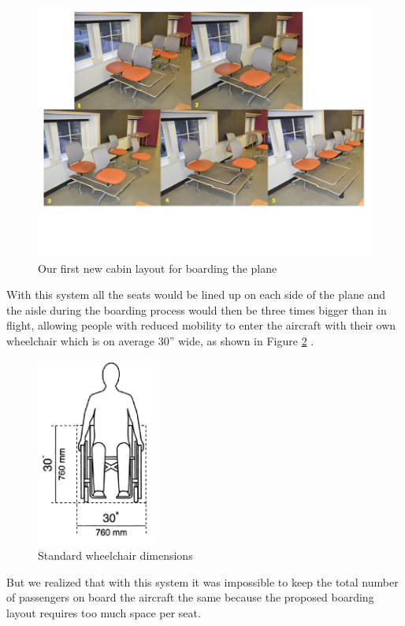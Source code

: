 \begin{figure}[h]
  \centering
     \includegraphics[width=12cm]{images/first_new_cabin_layout.png}
   \caption{Our first new cabin layout for boarding the plane}
  \label{fig:first_new_cabin_layout}
\end{figure} 

With this system all the seats would be lined up on each side of the plane and the aisle during the boarding process would then be three times bigger than in flight, allowing people with reduced mobility to enter the aircraft with their own wheelchair which is on average 30'' wide, as shown in Figure \ref{fig:wheelchair_dimensions} .

\begin{figure}[h]
  \centering
     \includegraphics[width=4cm]{images/wheelchair_dimensions.png}
   \caption{Standard wheelchair dimensions}
  \label{fig:wheelchair_dimensions}
\end{figure}

But we realized that with this system it was impossible to keep the total number of passengers on board the aircraft the same because the proposed boarding layout requires too much space per seat. 

